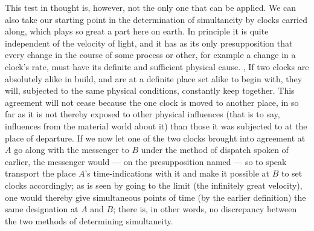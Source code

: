 \documentclass[12pt,a4paper]{article}
\begin{document}
This test in thought is, however, not the only one that can be applied. We can
also take our starting point in the determination of simultaneity by clocks
carried along, which plays so great a part here on earth. In principle it is
quite independent of the velocity of light, and it has as its only
presupposition that every change in the course of some process or other, for
example a change in a clock's rate, must have its definite and sufficient
physical cause. , If two clocks are absolutely alike in build, and are at a
definite place set alike to begin with, they will, subjected to the same
physical conditions, constantly keep together. This agreement will not cease
because the one clock is moved to another place, in so far as it is not
thereby exposed to other physical influences (that is to say, influences from
the material world about it) than those it was subjected to at the place of
departure. If we now let one of the two clocks brought into agreement at $A$
go along with the messenger to $B$ under the method of dispatch spoken of
earlier, the messenger would --- on the presupposition named --- so to speak
transport the place $A$'s time-indications with it and make it possible at $B$
to set clocks accordingly; as is seen by going to the limit (the infinitely
great velocity), one would thereby give simultaneous points of time (by the
earlier definition) the same designation at $A$ and $B$; there is, in other
words, no discrepancy between the two methods of determining simultaneity.
\end{document}
